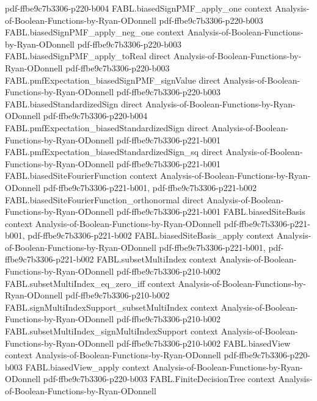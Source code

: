 \begin{theorem}
{    pdf-ffbe9c7b3306-p220-b004}
\proofstep
  {FABL.biasedSignPMF_apply_one}
  {context}
  {Analysis-of-Boolean-Functions-by-Ryan-ODonnell}
  {pdf-ffbe9c7b3306-p220-b003}
\proofstep
  {FABL.biasedSignPMF_apply_neg_one}
  {context}
  {Analysis-of-Boolean-Functions-by-Ryan-ODonnell}
  {pdf-ffbe9c7b3306-p220-b003}
\proofstep
  {FABL.biasedSignPMF_apply_toReal}
  {direct}
  {Analysis-of-Boolean-Functions-by-Ryan-ODonnell}
  {pdf-ffbe9c7b3306-p220-b003}
\proofstep
  {FABL.pmfExpectation_biasedSignPMF_signValue}
  {direct}
  {Analysis-of-Boolean-Functions-by-Ryan-ODonnell}
  {pdf-ffbe9c7b3306-p220-b003}
\proofstep
  {FABL.biasedStandardizedSign}
  {direct}
  {Analysis-of-Boolean-Functions-by-Ryan-ODonnell}
  {pdf-ffbe9c7b3306-p220-b004}
\proofstep
  {FABL.pmfExpectation_biasedStandardizedSign}
  {direct}
  {Analysis-of-Boolean-Functions-by-Ryan-ODonnell}
  {pdf-ffbe9c7b3306-p221-b001}
\proofstep
  {FABL.pmfExpectation_biasedStandardizedSign_sq}
  {direct}
  {Analysis-of-Boolean-Functions-by-Ryan-ODonnell}
  {pdf-ffbe9c7b3306-p221-b001}
\proofstep
  {FABL.biasedSiteFourierFunction}
  {context}
  {Analysis-of-Boolean-Functions-by-Ryan-ODonnell}
  {pdf-ffbe9c7b3306-p221-b001,
    pdf-ffbe9c7b3306-p221-b002}
\proofstep
  {FABL.biasedSiteFourierFunction_orthonormal}
  {direct}
  {Analysis-of-Boolean-Functions-by-Ryan-ODonnell}
  {pdf-ffbe9c7b3306-p221-b001}
\proofstep
  {FABL.biasedSiteBasis}
  {context}
  {Analysis-of-Boolean-Functions-by-Ryan-ODonnell}
  {pdf-ffbe9c7b3306-p221-b001,
    pdf-ffbe9c7b3306-p221-b002}
\proofstep
  {FABL.biasedSiteBasis_apply}
  {context}
  {Analysis-of-Boolean-Functions-by-Ryan-ODonnell}
  {pdf-ffbe9c7b3306-p221-b001,
    pdf-ffbe9c7b3306-p221-b002}
\proofstep
  {FABL.subsetMultiIndex}
  {context}
  {Analysis-of-Boolean-Functions-by-Ryan-ODonnell}
  {pdf-ffbe9c7b3306-p210-b002}
\proofstep
  {FABL.subsetMultiIndex_eq_zero_iff}
  {context}
  {Analysis-of-Boolean-Functions-by-Ryan-ODonnell}
  {pdf-ffbe9c7b3306-p210-b002}
\proofstep
  {FABL.signMultiIndexSupport_subsetMultiIndex}
  {context}
  {Analysis-of-Boolean-Functions-by-Ryan-ODonnell}
  {pdf-ffbe9c7b3306-p210-b002}
\proofstep
  {FABL.subsetMultiIndex_signMultiIndexSupport}
  {context}
  {Analysis-of-Boolean-Functions-by-Ryan-ODonnell}
  {pdf-ffbe9c7b3306-p210-b002}
\proofstep
  {FABL.biasedView}
  {context}
  {Analysis-of-Boolean-Functions-by-Ryan-ODonnell}
  {pdf-ffbe9c7b3306-p220-b003}
\proofstep
  {FABL.biasedView_apply}
  {context}
  {Analysis-of-Boolean-Functions-by-Ryan-ODonnell}
  {pdf-ffbe9c7b3306-p220-b003}
\proofstep
  {FABL.FiniteDecisionTree}
  {context}
  {Analysis-of-Boolean-Functions-by-Ryan-ODonnell}

\end{theorem}
